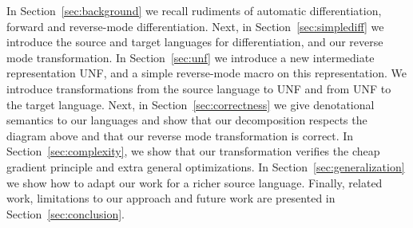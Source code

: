 In Section~\ref{sec:background} we recall rudiments of automatic differentiation, forward and reverse-mode differentiation.
Next, in Section~\ref{sec:simplediff} we introduce the source and target languages for differentiation, and our reverse mode transformation. 
In Section~\ref{sec:unf} we introduce a new intermediate representation UNF, and a simple reverse-mode macro on this representation.
We introduce transformations from the source language to UNF and from UNF to the target language.
Next, in Section~\ref{sec:correctness} we give denotational semantics to our languages and show that our decomposition respects the diagram above and that our reverse mode transformation is correct.
In Section~\ref{sec:complexity}, we show that our transformation verifies the cheap gradient principle and extra general optimizations.
In Section~\ref{sec:generalization} we show how to adapt our work for a richer source language. 
Finally, related work, limitations to our approach and future work are presented in Section~\ref{sec:conclusion}.
